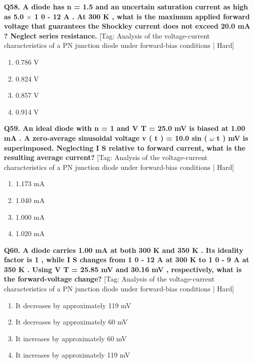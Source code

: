 \noindent\textbf{Q58. A diode has n = 1.5 and an uncertain saturation current as high as 5.0 $\times$ 1 0 - 12 A . At 300 K , what is the maximum applied forward voltage that guarantees the Shockley current does not exceed 20.0 mA ? Neglect series resistance.} \hfill [Tag: Analysis of the voltage-current characteristics of a PN junction diode under forward-bias conditions | Hard]
\begin{enumerate}[label=(\alph*),topsep=2pt,itemsep=1pt,partopsep=0pt,parsep=0pt]
    \item {0.786 V}
    \item {0.824 V}
    \item {0.857 V}
    \item {0.914 V}
\end{enumerate}
\vspace{2mm}

\noindent\textbf{Q59. An ideal diode with n = 1 and V T = 25.0 mV is biased at 1.00 mA . A zero-average sinusoidal voltage v ( t ) = 10.0 sin ( $\omega$ t ) mV is superimposed. Neglecting I S relative to forward current, what is the resulting average current?} \hfill [Tag: Analysis of the voltage-current characteristics of a PN junction diode under forward-bias conditions | Hard]
\begin{enumerate}[label=(\alph*),topsep=2pt,itemsep=1pt,partopsep=0pt,parsep=0pt]
    \item {1.173 mA}
    \item {1.040 mA}
    \item {1.000 mA}
    \item {1.020 mA}
\end{enumerate}
\vspace{2mm}

\noindent\textbf{Q60. A diode carries 1.00 mA at both 300 K and 350 K . Its ideality factor is 1 , while I S changes from 1 0 - 12 A at 300 K to 1 0 - 9 A at 350 K . Using V T = 25.85 mV and 30.16 mV , respectively, what is the forward-voltage change?} \hfill [Tag: Analysis of the voltage-current characteristics of a PN junction diode under forward-bias conditions | Hard]
\begin{enumerate}[label=(\alph*),topsep=2pt,itemsep=1pt,partopsep=0pt,parsep=0pt]
    \item {It decreases by approximately 119 mV}
    \item {It decreases by approximately 60 mV}
    \item {It increases by approximately 60 mV}
    \item {It increases by approximately 119 mV}
\end{enumerate}
\vspace{2mm}


